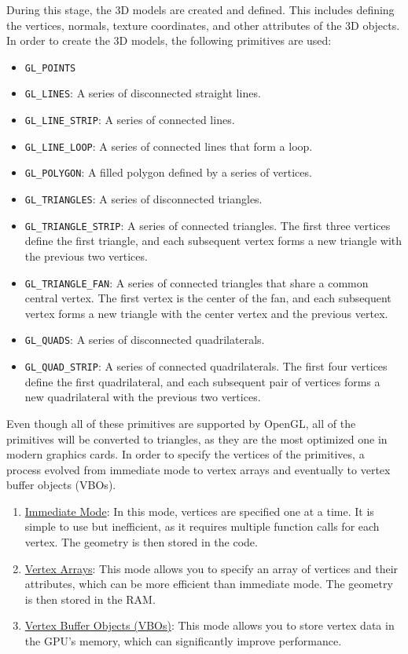 During this stage, the 3D models are created and defined. This includes defining the vertices, normals, texture coordinates, and other attributes of the 3D objects. In order to create the 3D models, the following primitives are used:
\begin{itemize}
    \item \texttt{GL\_POINTS}
    \item \texttt{GL\_LINES}: A series of disconnected straight lines.
    \item \texttt{GL\_LINE\_STRIP}: A series of connected lines.
    \item \texttt{GL\_LINE\_LOOP}: A series of connected lines that form a loop.
    \item \texttt{GL\_POLYGON}: A filled polygon defined by a series of vertices.
    \item \texttt{GL\_TRIANGLES}: A series of disconnected triangles.
    \item \texttt{GL\_TRIANGLE\_STRIP}: A series of connected triangles. The first three vertices define the first triangle, and each subsequent vertex forms a new triangle with the previous two vertices.
    \item \texttt{GL\_TRIANGLE\_FAN}: A series of connected triangles that share a common central vertex. The first vertex is the center of the fan, and each subsequent vertex forms a new triangle with the center vertex and the previous vertex.
    \item \texttt{GL\_QUADS}: A series of disconnected quadrilaterals.
    \item \texttt{GL\_QUAD\_STRIP}: A series of connected quadrilaterals. The first four vertices define the first quadrilateral, and each subsequent pair of vertices forms a new quadrilateral with the previous two vertices.
\end{itemize}

Even though all of these primitives are supported by OpenGL, all of the primitives will be converted to triangles, as they are the most optimized one in modern graphics cards. In order to specify the vertices of the primitives, a process evolved from immediate mode to vertex arrays and eventually to vertex buffer objects (VBOs).
\begin{enumerate}
    \item \ul{Immediate Mode}: In this mode, vertices are specified one at a time. It is simple to use but inefficient, as it requires multiple function calls for each vertex. The geometry is then stored in the code.
    \item \ul{Vertex Arrays}: This mode allows you to specify an array of vertices and their attributes, which can be more efficient than immediate mode. The geometry is then stored in the RAM.
    \item \ul{Vertex Buffer Objects (VBOs)}: This mode allows you to store vertex data in the GPU's memory, which can significantly improve performance.
\end{enumerate}

